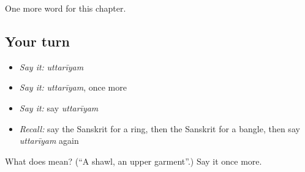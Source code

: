 \begin{grammarlens}[title={What you've built}]
One more word for this chapter.
\end{grammarlens}

\subsection*{Your turn}
\begin{itemize}
\raggedright
  \item \emph{Say it:} \emph{uttarīyam}
  \item \emph{Say it:} \emph{uttarīyam}, once more
  \item \emph{Say it:} say \emph{uttarīyam}
  \item \emph{Recall:} say the Sanskrit for a ring, then the Sanskrit for a bangle, then say \emph{uttarīyam} again
\end{itemize}

\begin{tcolorbox}[breakable,colback=teal!4,colframe=teal!35!black,title={Before you move on}]
What does  mean? (\textquotedblleft{}A shawl, an upper garment\textquotedblright{}.) Say it once more.
\end{tcolorbox}
